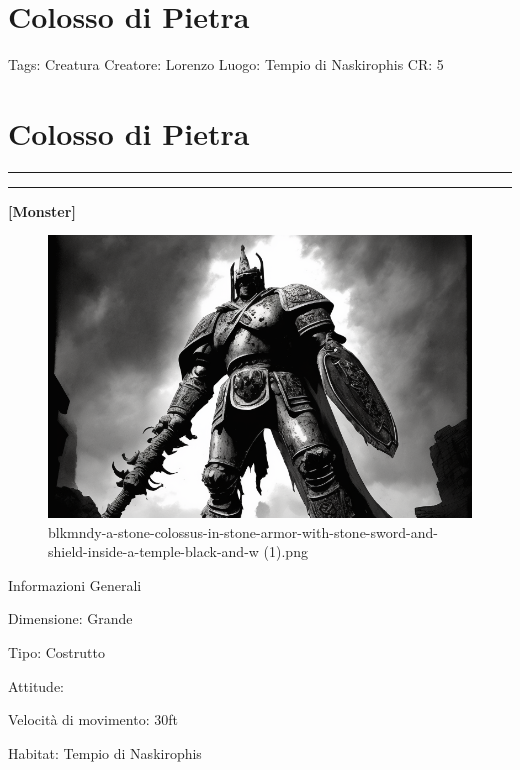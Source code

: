 \section{Colosso di Pietra}\label{colosso-di-pietra}

Tags: Creatura Creatore: Lorenzo Luogo: Tempio di Naskirophis CR: 5

\section{Colosso di Pietra}\label{colosso-di-pietra-1}

\begin{center}\rule{0.5\linewidth}{0.5pt}\end{center}

\begin{center}\rule{0.5\linewidth}{0.5pt}\end{center}

\textbf{{[}Monster{]}}

\begin{figure}
\centering
\includegraphics{blkmndy-a-stone-colossus-in-stone-armor-with-stone-sword-and-shield-inside-a-temple-black-and-w_(1).png}
\caption{blkmndy-a-stone-colossus-in-stone-armor-with-stone-sword-and-shield-inside-a-temple-black-and-w
(1).png}
\end{figure}

Informazioni Generali

Dimensione: Grande

Tipo: Costrutto

Attitude:

Velocità di movimento: 30ft

Habitat: Tempio di Naskirophis

